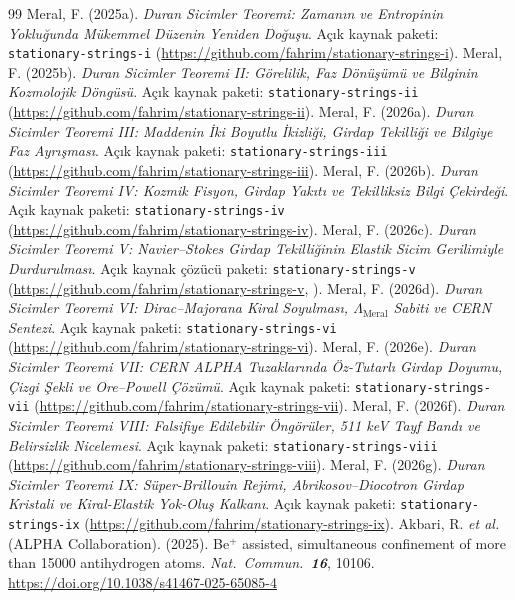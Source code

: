 \documentclass[12pt,a4paper]{article}
\begin{document}
\begin{thebibliography}{99}
     Meral, F. (2025a). \textit{Duran Sicimler Teoremi: Zamanın ve Entropinin Yokluğunda Mükemmel Düzenin Yeniden Doğuşu}. Açık kaynak paketi: \texttt{stationary-strings-i} (\url{https://github.com/fahrim/stationary-strings-i}).
     Meral, F. (2025b). \textit{Duran Sicimler Teoremi II: Görelilik, Faz Dönüşümü ve Bilginin Kozmolojik Döngüsü}. Açık kaynak paketi: \texttt{stationary-strings-ii} (\url{https://github.com/fahrim/stationary-strings-ii}).
     Meral, F. (2026a). \textit{Duran Sicimler Teoremi III: Maddenin İki Boyutlu İkizliği, Girdap Tekilliği ve Bilgiye Faz Ayrışması}. Açık kaynak paketi: \texttt{stationary-strings-iii} (\url{https://github.com/fahrim/stationary-strings-iii}).
     Meral, F. (2026b). \textit{Duran Sicimler Teoremi IV: Kozmik Fisyon, Girdap Yakıtı ve Tekilliksiz Bilgi Çekirdeği}. Açık kaynak paketi: \texttt{stationary-strings-iv} (\url{https://github.com/fahrim/stationary-strings-iv}).
     Meral, F. (2026c). \textit{Duran Sicimler Teoremi V: Navier--Stokes Girdap Tekilliğinin Elastik Sicim Gerilimiyle Durdurulması}. Açık kaynak çözücü paketi: \texttt{stationary-strings-v} (\url{https://github.com/fahrim/stationary-strings-v}, ).
     Meral, F. (2026d). \textit{Duran Sicimler Teoremi VI: Dirac--Majorana Kiral Soyulması, $\Lambda_{\mathrm{Meral}}$ Sabiti ve CERN Sentezi}. Açık kaynak paketi: \texttt{stationary-strings-vi} (\url{https://github.com/fahrim/stationary-strings-vi}).
     Meral, F. (2026e). \textit{Duran Sicimler Teoremi VII: CERN ALPHA Tuzaklarında Öz-Tutarlı Girdap Doyumu, Çizgi Şekli ve Ore--Powell Çözümü}. Açık kaynak paketi: \texttt{stationary-strings-vii} (\url{https://github.com/fahrim/stationary-strings-vii}).
     Meral, F. (2026f). \textit{Duran Sicimler Teoremi VIII: Falsifiye Edilebilir Öngörüler, 511 keV Tayf Bandı ve Belirsizlik Nicelemesi}. Açık kaynak paketi: \texttt{stationary-strings-viii} (\url{https://github.com/fahrim/stationary-strings-viii}).
     Meral, F. (2026g). \textit{Duran Sicimler Teoremi IX: Süper-Brillouin Rejimi, Abrikosov--Diocotron Girdap Kristali ve Kiral-Elastik Yok-Oluş Kalkanı}. Açık kaynak paketi: \texttt{stationary-strings-ix} (\url{https://github.com/fahrim/stationary-strings-ix}).
     Akbari, R. \textit{et al.} (ALPHA Collaboration). (2025). Be$^+$ assisted, simultaneous confinement of more than 15000 antihydrogen atoms. \textit{Nat.\ Commun.\ \textbf{16}}, 10106. \url{https://doi.org/10.1038/s41467-025-65085-4}

\end{thebibliography}
\end{document}
